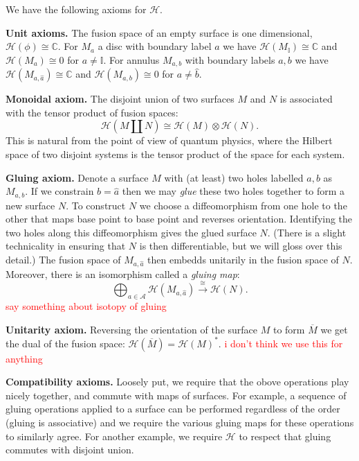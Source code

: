\documentclass[aps, prl, letterpaper, twocolumn, superscriptaddress, notitlepage, 10pt]{revtex4-1}
\newcommand{\vac}{\mathbb{I}}
\newcommand{\simon}[1]{\textcolor{red}{#1}}
\newcommand{\F}{\mathscr{H}} %
\newcommand{\C}{\mathbb{C}}
\newcommand{\A}{\mathcal{A}}
\newcommand{\subsub}[1]{{\bf #1}}
\begin{document}
We have the following axioms for $\F.$

{\bf Unit axioms.}
The fusion space of an empty surface is one dimensional, 
$\F(\phi) \cong \C.$ %
For $M_a$ a disc with boundary label $a$ we have
$\F(M_\vac)\cong \C$ and 
$\F(M_a)\cong 0$ for $a\ne \vac.$
For annulus $M_{a,b}$ with boundary labels
$a, b$ we have
$\F(M_{a,\widehat{a}})\cong \C$ and 
$\F(M_{a,b})\cong 0$ for $a\ne \widehat{b}.$

{\bf Monoidal axiom.}
The disjoint union of two surfaces $M$ and $N$ 
is associated with
the tensor product of fusion spaces:
$$
    \F(M\amalg N) \cong \F(M)\otimes \F(N).
$$
This is natural from the point of view of quantum
physics, where the Hilbert space of two disjoint
systems is the tensor product of the space for
each system.

{\bf Gluing axiom.}
Denote a surface $M$ with (at least) two holes
labelled $a, b$ as $M_{a,b}$. 
If we constrain $b=\widehat{a}$ 
then we may \emph{glue} these two holes together
to form a new surface $N.$
To construct $N$ we choose a diffeomorphism from one
hole to the other that maps base point to base point 
and reverses orientation.
Identifying the two holes along this diffeomorphism
gives the glued surface $N.$
(There is a slight technicality in ensuring that $N$ is
then differentiable, but we will gloss over this detail.)
The fusion space of $M_{a,\widehat{a}}$ then embedds unitarily in the fusion
space of $N.$
Moreover, there is an isomorphism called
a \emph{gluing map}:
$$
    \bigoplus_{a\in\A} \F(M_{a,\widehat{a}}) \xrightarrow{\cong} \F(N).
$$
\simon{say something about isotopy of gluing}

{\bf Unitarity axiom.}
Reversing the orientation of the surface $M$
to form $\overline{M}$ we get the dual of the fusion space:
$\F(\overline{M})=\F(M)^*.$
\simon{i don't think we use this for anything}

\subsub{Compatibility axioms.}
Loosely put, we require that the obove operations play nicely together,
and commute with maps of surfaces.
For example,
a sequence of gluing operations 
applied to a surface can
be performed regardless of the order (gluing is associative)
and we require the various gluing maps for these operations to similarly agree.
For another example, we require $\F$ to respect that gluing
commutes with disjoint union.
\end{document}
